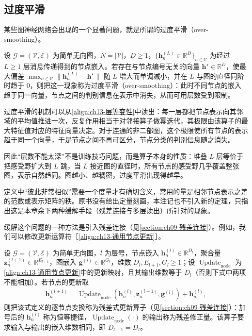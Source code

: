 \documentclass[../../main.tex]{subfiles}
\begin{document}
\subsection{过度平滑}\label{subsection:ch13-过度平滑}

某些图神经网络会出现的一个显著问题，就是所谓的过度平滑（over-smoothing）。

\begin{definition}[过度平滑]\label{definition:ch13-过度平滑}
设 $\mathcal{G}=(\mathcal{V},\mathcal{E})$ 为简单无向图，$N=|\mathcal{V}|$，$D\geqslant1$，$\{\bm{h}_n^{(L)}\in\mathbb{R}^{D}\}_{n\in\mathcal{V}}$ 为经过 $L\geqslant1$ 层消息传递得到的节点嵌入。若存在与节点编号无关的向量 $\bm{h}^{\star}\in\mathbb{R}^{D}$，使最大偏差 $\max_{n\in\mathcal{V}}\|\bm{h}_n^{(L)}-\bm{h}^{\star}\|$ 随 $L$ 增大而单调减小，并在 $L$ 与图的直径同阶时趋于 $0$，则把这一现象称为过度平滑（over-smoothing）：此时不同节点的嵌入趋于同一向量，节点之间的判别信息在表示中消失，从而可用层数受到限制。
\end{definition}

\begin{remark}
过度平滑的机制可以从\eqref{align:ch13-层等变性}中读出：每一层都把节点表示向其邻域的平均值推进一次，反复作用相当于对邻接算子做幂迭代，其极限由该算子的最大特征值对应的特征向量决定。对于连通的非二部图，这个极限使所有节点的表示趋于同一个向量，于是节点之间不再可区分，节点分类的判别信息随之消失。\par
因此“层数不能太深”不是训练技巧问题，而是算子本身的性质：堆叠 $L$ 层等价于把感受野扩大到 $L$ 跳，当 $L$ 接近图的直径时，所有节点的感受野几乎覆盖整张图，表示自然趋同。图越小、越稠密，过度平滑出现得越早。\par
定义中“彼此非常相似”需要一个度量才有确切含义，常用的量是相邻节点表示之差的范数或表示矩阵的秩。原书没有给出定量刻画，本注记也不引入新的定理，只指出这是本章余下两种缓解手段（残差连接与多层读出）所针对的现象。
\end{remark}

缓解这个问题的一种方法是引入残差连接（见\cref{section:ch09-残差连接}）。例如，我们可以修改更新运算符［\eqref{align:ch13-通用节点更新}］。

\begin{definition}[残差式更新算子]\label{definition:ch13-残差更新}
设 $\mathcal{G}=(\mathcal{V},\mathcal{E})$ 为简单无向图，$l$ 为层号，节点嵌入 $\bm{h}_n^{(l)}\in\mathbb{R}^{D_l}$，聚合量 $\bm{z}_n^{(l+1)}\in\mathbb{R}^{E_{l+1}}$，图嵌入 $\bm{g}^{(l)}\in\mathbb{R}^{G_l}$，维数 $D_l,E_{l+1},G_l\geqslant1$；设 $\operatorname{Update}_{\mathrm{node}}$ 为\eqref{align:ch13-通用节点更新}中的更新映射，且其输出维数等于 $D_l$（否则下式中两项不能相加）。若节点的更新取
\begin{align}
\bm{h}_n^{(l+1)}=\operatorname{Update}_{\mathrm{node}}\!\left(\bm{h}_n^{(l)},\bm{z}_n^{(l+1)},\bm{g}^{(l)}\right)+\bm{h}_n^{(l)},
\label{align:ch13-残差}
\end{align}
则把该式定义的逐节点变换称为残差式更新算子（见\cref{section:ch09-残差连接}）：加号后的 $\bm{h}_n^{(l)}$ 称为恒等捷径，$\operatorname{Update}_{\mathrm{node}}(\cdot)$ 的输出称为残差修正量。该算子要求输入与输出的嵌入维数相同，即 $D_{l+1}=D_l$。
\end{definition}
\end{document}
